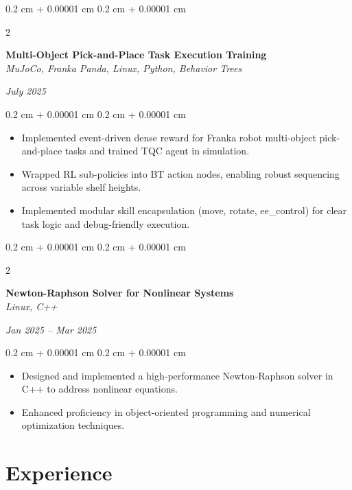 \documentclass[10pt, letterpaper]{article}
\newenvironment{highlights}{
    \begin{itemize}[
        topsep=0.10 cm,
        parsep=0.10 cm,
        partopsep=0pt,
        itemsep=0pt,
        leftmargin=0.4 cm + 10pt
    ]
}{
    \end{itemize}
}
\newenvironment{onecolentry}{
    \begin{adjustwidth}{
        0.2 cm + 0.00001 cm
    }{
        0.2 cm + 0.00001 cm
    }
}{
    \end{adjustwidth}
}
\newenvironment{twocolentry}[2][]{
    \onecolentry
    \def\secondColumn{#2}
    \setcolumnwidth{\fill, 4.5 cm}
    \begin{paracol}{2}
}{
    \switchcolumn \raggedleft \secondColumn
    \end{paracol}
    \endonecolentry
}
\begin{document}
    \vspace{0.2 cm}

    \begin{twocolentry}{\textit{July 2025}}
        \textbf{Multi-Object Pick-and-Place Task Execution Training} \\
        \textit{MuJoCo, Franka Panda, Linux, Python, Behavior Trees}
    \end{twocolentry}

    \vspace{0.10 cm}
    \begin{onecolentry}
        \begin{highlights}
            \item Implemented event-driven dense reward for Franka robot multi-object pick-and-place tasks and trained TQC agent in simulation.
            \item Wrapped RL sub-policies into BT action nodes, enabling robust sequencing across variable shelf heights.
            \item Implemented modular skill encapsulation (move, rotate, ee\_control) for clear task logic and debug-friendly execution.
        \end{highlights}
    \end{onecolentry}

    \vspace{0.2 cm}

    \begin{twocolentry}{\textit{Jan 2025 -- Mar 2025}}
        \textbf{Newton-Raphson Solver for Nonlinear Systems} \\
        \textit{Linux, C++}
    \end{twocolentry}

    \vspace{0.10 cm}
    \begin{onecolentry}
        \begin{highlights}
            \item Designed and implemented a high-performance Newton-Raphson solver in C++ to address nonlinear equations.
            \item Enhanced proficiency in object-oriented programming and numerical optimization techniques.
        \end{highlights}
    \end{onecolentry}

    \vspace{0.3 cm}

    \section{Experience}
\end{document}
